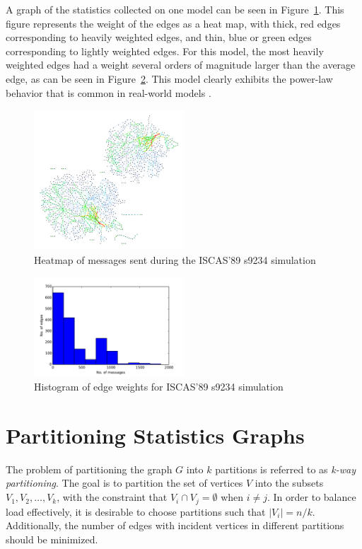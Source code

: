 \documentclass[11pt]{book}
\begin{document}
A graph of the statistics collected on one model can be seen in Figure~\ref{fig:s9234}. This figure represents the weight of the edges as a heat map, with thick, red edges corresponding to heavily weighted edges, and thin, blue or green edges corresponding to lightly weighted edges. For this model, the most heavily weighted edges had a weight several orders of magnitude larger than the average edge, as can be seen in Figure~\ref{fig:s9234_histo}. This model clearly exhibits the power-law behavior that is common in real-world models \cite{clauset-09}.

\begin{figure}[h]\label{fig:s9234}
\centering
\includegraphics[clip=true,width=0.5\textwidth]{figs/s9234}
\caption{Heatmap of messages sent during the ISCAS'89 s9234 simulation}
\end{figure}

\begin{figure}[h]\label{fig:s9234_histo}
\centering
\includegraphics[clip=true,width=0.5\textwidth]{figs/s9234_histo}
\caption{Histogram of edge weights for ISCAS'89 s9234 simulation}
\end{figure}

\section{Partitioning Statistics Graphs}

The problem of partitioning the graph \(G\) into \(k\) partitions is referred to as \emph{k-way partitioning}. The goal is to partition the set of vertices \(V\) into the subsets \(V_1, V_2, \ldots, V_k\), with the constraint that \(V_i \cap V_j = \emptyset\) when \(i \neq j\). In order to balance load effectively, it is desirable to choose partitions such that \(|V_i|=n/k\). Additionally, the number of edges with incident vertices in different partitions should be minimized.
\end{document}
